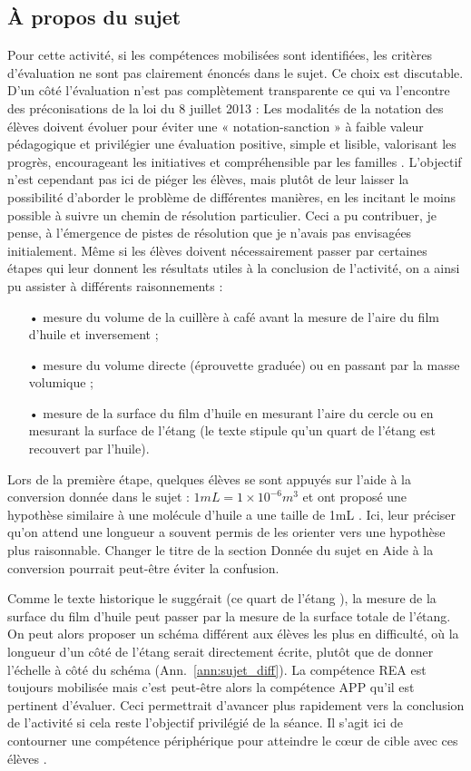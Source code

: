 \documentclass[12pt,a4paper, fleqn]{report}
\newcommand{\app}{\colorbox{bleu_c}{\textcolor{bleu_f}{APP}}}
\newcommand{\rea}{\colorbox{yellow_c}{\textcolor{yellow_f}{REA}}}
\begin{document}
\subsection{À propos du sujet}
\label{sec:sujet}

Pour cette activité, si les compétences mobilisées sont identifiées, les critères d'évaluation ne sont pas clairement énoncés dans le sujet.
Ce choix est discutable.
D'un côté l'évaluation n'est pas complètement transparente  ce qui va l'encontre des préconisations de la loi du 8 juillet 2013 \cite{Loi2013} : \og Les modalités de la notation des élèves doivent évoluer pour éviter une « notation-sanction » à faible valeur pédagogique et privilégier une évaluation positive, simple et lisible, valorisant les progrès, encourageant les initiatives et compréhensible par les familles \fg{}.
L'objectif n'est cependant pas ici de piéger les élèves, mais plutôt de leur laisser la possibilité d'aborder le problème de différentes manières, en les incitant le moins possible à suivre un chemin de résolution particulier.
Ceci a pu contribuer, je pense, à l'émergence de pistes de résolution que je n'avais pas envisagées initialement.
Même si les élèves doivent nécessairement passer par certaines étapes qui leur donnent les résultats utiles à la conclusion de l'activité, on a ainsi pu assister à différents raisonnements : 
\begin{itemize}
\item[•] mesure du volume de la cuillère à café avant la mesure de l'aire du film d'huile et inversement ;
\item[•] mesure du volume directe (éprouvette graduée) ou en passant par la masse volumique ;
\item[•] mesure de la surface du film d'huile en mesurant l'aire du cercle ou en mesurant la surface de l'étang (le texte stipule qu'un quart de l'étang est recouvert par l'huile).
\end{itemize}

Lors de la première étape, quelques élèves se sont appuyés sur l'aide à la conversion donnée dans le sujet : $\unit{1}{mL} = \unit{1 \times 10^{-6}}{m^3} $ et ont proposé une hypothèse similaire à \og une molécule d'huile a une taille de \unit{1}{mL} \fg{}.
Ici, leur préciser qu'on attend une longueur a souvent permis de les orienter vers une hypothèse plus raisonnable.
Changer le titre de la section \og Donnée \fg{} du sujet en \og Aide à la conversion \fg{} pourrait peut-être éviter la confusion.

Comme le texte historique le suggérait (\og ce quart de l'étang \fg{}), la mesure de la surface du film d'huile peut passer par la mesure de la surface totale de l'étang.
On peut alors proposer un schéma différent aux élèves les plus en difficulté, où la longueur d'un côté de l'étang serait directement écrite, plutôt que de donner l'échelle à côté du schéma (Ann.~\ref{ann:sujet_diff}).
La compétence \rea{} est toujours mobilisée mais c'est peut-être alors la compétence \app{} qu'il est pertinent d'évaluer.
Ceci permettrait d'avancer plus rapidement vers la conclusion de l'activité si cela reste l'objectif privilégié de la séance.
Il s'agit ici de contourner une compétence périphérique pour atteindre le cœur de cible avec ces élèves \cite{Benoit2012}.
\end{document}
